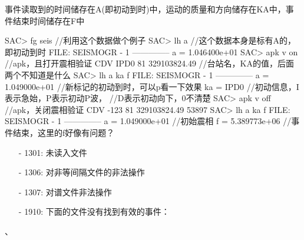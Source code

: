 事件读取到的时间储存在A(即初动到时)中，运动的质量和方向储存在KA中，事件结束时间储存在F中

\begin{SACCode}
SAC> fg seis                //利用这个数据做个例子
SAC> lh a                   //这个数据本身是标有A的，即初动到时
  FILE: SEISMOGR - 1
 --------------
     a = 1.046400e+01
SAC> apk v on               //apk，且打开震相验证
 CDV IPD0 81 329103824.49   //台站名，KA的值，后面两个不知道是什么
SAC> lh a ka f
  FILE: SEISMOGR - 1
 --------------
      a = 1.049000e+01      //新标记的初动到时，可以p看一下效果
     ka = IPD0              //初动信息，I表示急始，P表示初动P波，
                            //D表示初动向下，0不清楚
SAC> apk v off              //apk，关闭震相验证
 CDV -123 81 329103824.49                                              53897
SAC> lh a ka f		
  FILE: SEISMOGR - 1
 --------------
     a = 1.049000e+01       //初始震相
     f = 5.389773e+06       //事件结束，这里的f好像有问题？
\end{SACCode}

\begin{itemize}
\item[-]1301: 未读入文件
\item[-]1306: 对非等间隔文件的非法操作
\item[-]1307: 对谱文件非法操作
\end{itemize}

\begin{itemize}
\item[-]1910: 下面的文件没有找到有效的事件：
\end{itemize}

、
